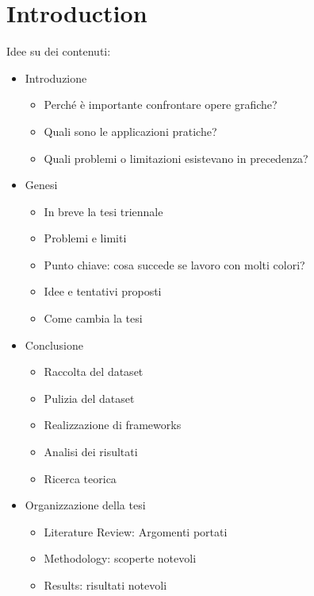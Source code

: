 \chapter{Introduction}
\begin{toDo}
	Idee su dei contenuti:
	\begin{itemize}
		\item Introduzione
		\begin{itemize}
			\item Perché è importante confrontare opere grafiche?
			\item Quali sono le applicazioni pratiche?
			\item Quali problemi o limitazioni esistevano in precedenza?
		\end{itemize}
		\item Genesi
		\begin{itemize}
			\item In breve la tesi triennale
			\item Problemi e limiti
			\item Punto chiave: cosa succede se lavoro con molti colori?
			\item Idee e tentativi proposti
			\item Come cambia la tesi
		\end{itemize}
		\item Conclusione
		\begin{itemize}
			\item Raccolta del dataset
			\item Pulizia del dataset
			\item Realizzazione di frameworks
			\item Analisi dei risultati
			\item Ricerca teorica
		\end{itemize}
		\item Organizzazione della tesi
		\begin{itemize}
			\item Literature Review: Argomenti portati
			\item Methodology: scoperte notevoli
			\item Results: risultati notevoli
		\end{itemize}
	\end{itemize}
\end{toDo}


